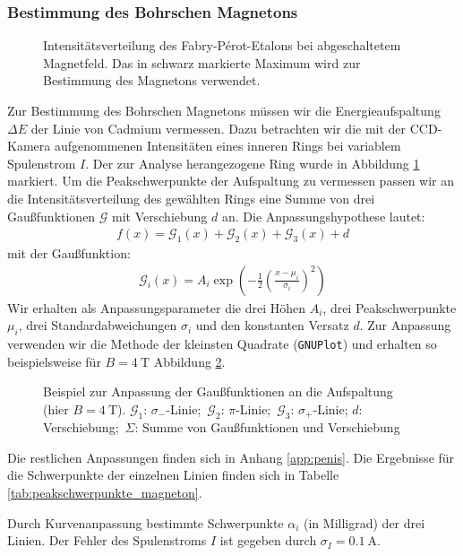\documentclass[11pt, a4paper]{article}
\begin{document}
\FloatBarrier
\subsubsection{Bestimmung des Bohrschen Magnetons}
\label{sssec:magneton}
\begin{figure}[h]
	\centering
	
	\caption{Intensitätsverteilung des Fabry-Pérot-Etalons bei abgeschaltetem Magnetfeld. Das in schwarz markierte Maximum wird zur Bestimmung des Magnetons verwendet.}
	\label{fig:peakauswahl}
\end{figure}
Zur Bestimmung des Bohrschen Magnetons müssen wir die Energieaufspaltung $\Delta E$ der Linie von Cadmium vermessen.
Dazu betrachten wir die mit der CCD-Kamera aufgenommenen Intensitäten eines inneren Rings bei variablem Spulenstrom $I$.
Der zur Analyse herangezogene Ring wurde in Abbildung \ref{fig:peakauswahl} markiert.
Um die Peakschwerpunkte der Aufspaltung zu vermessen passen wir an die Intensitätsverteilung des gewählten Rings eine Summe von drei Gaußfunktionen $\mathcal{G}$ mit Verschiebung $d$ an.
Die Anpassungshypothese lautet:
\begin{align}
f(x) = \mathcal{G}_1(x) + \mathcal{G}_2(x) + \mathcal{G}_3(x) + d
\end{align}
mit der Gaußfunktion:
\begin{align}
\mathcal{G}_i(x) = A_i \exp\left( -\frac{1}{2} \left( \frac{x - \mu_i}{\sigma_i} \right)^2 \right)
\end{align}
Wir erhalten als Anpassungsparameter die drei Höhen $A_i$, drei Peakschwerpunkte $\mu_i$, drei Standardabweichungen $\sigma_i$ und den konstanten Versatz $d$.
Zur Anpassung verwenden wir die Methode der kleinsten Quadrate (\texttt{GNUPlot}) und erhalten so beispielsweise für $B = \SI{4}{\tesla}$ Abbildung \ref{fig:zeeman_b4_bsp}.
\begin{figure}[h]
	\centering
	
	\caption{Beispiel zur Anpassung der Gaußfunktionen an die Aufspaltung (hier $B = \SI{4}{\tesla}$). $\mathcal{G}_1$: $\sigma_-$-Linie;\, $\mathcal{G}_2$: $\pi$-Linie;\, $\mathcal{G}_3$: $\sigma_+$-Linie; $d$: Verschiebung;\, $\Sigma$: Summe von Gaußfunktionen und Verschiebung}
	\label{fig:zeeman_b4_bsp}
\end{figure}
Die restlichen Anpassungen finden sich in Anhang \ref{app:penis}.
Die Ergebnisse für die Schwerpunkte der einzelnen Linien finden sich in Tabelle \ref{tab:peakschwerpunkte_magneton}.

\begin{table}[h]
	\centering
	\resizebox{\columnwidth}{!}{%
		}
	\caption{Durch Kurvenanpassung bestimmte Schwerpunkte $\alpha_i$ (in Milligrad) der drei Linien. Der Fehler des Spulenstroms $I$ ist gegeben durch $\sigma_I = \SI{0.1}{\ampere}$.}
	\label{tab:peakschwerpunkte_magneton}
\end{table}
\end{document}
